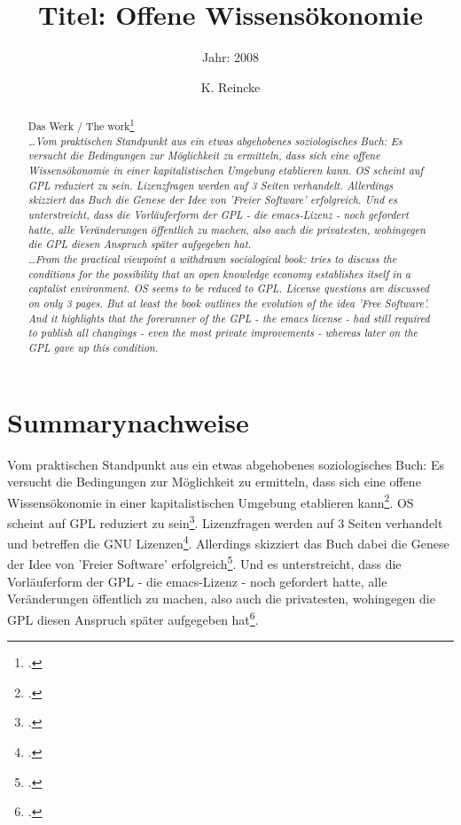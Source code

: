 \documentclass[DIV=calc,BCOR=5mm,11pt,headings=small,oneside,abstract=true, toc=bib]{scrartcl}
\begin{document}

\titlehead{Literaturexzerpt}
\subject{Autor(en): Sebald}
\title{Titel: Offene Wissensökonomie}
\subtitle{Jahr: 2008 }
\author{K. Reincke}

\maketitle

\begin{abstract}
\noindent
Das Werk / The work\footcite[][]{Sebald2008a} \\
\noindent \itshape
\ldots Vom praktischen Standpunkt aus ein etwas abgehobenes soziologisches Buch:
Es versucht die Bedingungen zur Möglichkeit zu ermitteln, dass sich eine offene
Wissensökonomie in einer kapitalistischen Umgebung etablieren kann. OS scheint
auf GPL reduziert zu sein. Lizenzfragen werden auf 3 Seiten verhandelt.
Allerdings skizziert das Buch die Genese der Idee von 'Freier Software'
erfolgreich. Und es unterstreicht, dass die Vorläuferform der GPL - die
emacs-Lizenz - noch gefordert hatte, alle Veränderungen öffentlich zu machen,
also auch die privatesten, wohingegen die GPL diesen Anspruch später aufgegeben
hat.\\
\noindent
\ldots From the practical viewpoint a withdrawn socialogical book: tries to
discuss the conditions for the possibility that an open knowledge economy
establishes itself in a captalist environment. OS seems to be reduced to GPL.
License questions are discussed on only 3 pages. But at least the book outlines
the evolution of the idea 'Free Software'. And it highlights that the forerunner
of the GPL - the emacs license - had still required to publish all changings -
even the most private improvements - whereas later on the GPL gave up this
condition. 
\end{abstract}
\footnotesize
\normalsize

\section{Summarynachweise}

Vom praktischen Standpunkt aus ein etwas abgehobenes soziologisches Buch:
Es versucht die Bedingungen zur Möglichkeit zu ermitteln, dass sich eine offene
Wissensökonomie in einer kapitalistischen Umgebung etablieren
kann\footcite[vgl.][17]{Sebald2008a}. OS scheint auf GPL reduziert zu
sein\footcite[vgl.][63ff]{Sebald2008a}. Lizenzfragen werden auf 3 Seiten
verhandelt und betreffen die GNU Lizenzen\footcite[vgl.][75ff]{Sebald2008a}.
Allerdings skizziert das Buch dabei die Genese der Idee von 'Freier Software'
erfolgreich\footcite[vgl.][83ff]{Sebald2008a}. Und es unterstreicht, dass die
Vorläuferform der GPL - die emacs-Lizenz - noch gefordert hatte, alle
Veränderungen öffentlich zu machen, also auch die privatesten, wohingegen die
GPL diesen Anspruch später aufgegeben hat\footcite[vgl.][76]{Sebald2008a}.
\end{document}
